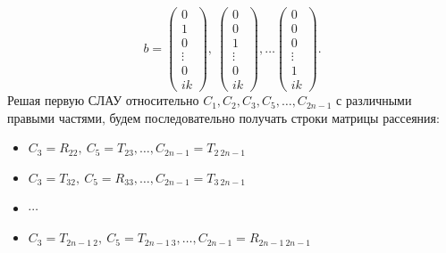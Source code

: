\documentclass[a4 paper, 12 pt]{extarticle}
\begin{document}
   \[b = \left(\begin{smallmatrix}
   0 \\
   1 \\
   0 \\
   \vdots \\
   0 \\
   ik
   \end{smallmatrix}\right), \ 
   \left(\begin{smallmatrix}
   0 \\
   0 \\
   1 \\
   \vdots \\
   0 \\
   ik
   \end{smallmatrix}\right), \ldots
   \left(\begin{smallmatrix}
   0 \\
   0 \\
   0 \\
   \vdots \\
   1 \\
   ik
   \end{smallmatrix}\right).
   \]
   Решая первую СЛАУ относительно $C_1, C_2, C_3, C_5, \ldots, C_{2n-1}$ с различными правыми частями, будем последовательно получать строки матрицы рассеяния: 
   
   \begin{itemize}
   	\item $C_3 = R_{22}, \ C_5 = T_{23}, \ldots, C_{2n-1} = T_{2 \ 2n-1}$ 
   	\item $C_3 = T_{32}, \ C_5 = R_{33}, \ldots, C_{2n-1} = T_{3 \ 2n-1} $
   	\item $\cdots$ 
   	\item $C_3 = T_{2n-1 \ 2}, \ C_5 = T_{2n-1 \ 3}, \ldots, C_{2n-1} = R_{2n-1 \  2n-1}$ 
   \end{itemize}
    
   \pagebreak
    
\end{document}
